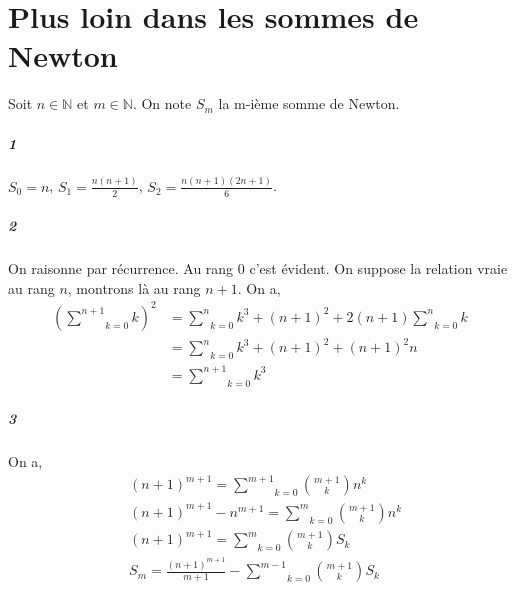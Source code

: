 \documentclass[10pt,a4paper]{article}
\begin{document}
\section{Plus loin dans les sommes de Newton}
Soit $n \in \mathbb{N}$ et $m \in \mathbb{N}$. On note $S_m$ la m-ième somme de Newton.
\subparagraph{1}$S_0 = n$, $S_1 = \frac{n(n+1)}{2}$, $S_2 = \frac{n(n+1)(2n+1)}{6}$.
\subparagraph{2}On raisonne par récurrence. Au rang $0$ c'est évident. On suppose la relation vraie au rang $n$, montrons là au rang $n+1$. On a,
\begin{equation}
\begin{aligned}
\left(\underset{k=0}{\overset{n+1}{\sum}} k\right)^2 &= \underset{k=0}{\overset{n}{\sum}}k^3 + (n+1)^2 + 2(n+1) \underset{k=0}{\overset{n}{\sum}} k \\
&= \underset{k=0}{\overset{n}{\sum}}k^3  + (n+1)^2 + (n+1)^2n \\
&= \underset{k=0}{\overset{n+1}{\sum}}k^3
\end{aligned}
\end{equation}
\subparagraph{3}On a,
\begin{equation}
\begin{aligned}
&(n+1)^{m+1} = \underset{k=0}{\overset{m+1}{\sum}}\binom{m+1}{k}n^k \\
&(n+1)^{m+1} - n^{m+1} = \underset{k=0}{\overset{m}{\sum}}\binom{m+1}{k}n^k \\
&(n+1)^{m+1} = \underset{k=0}{\overset{m}{\sum}} \binom{m+1}{k} S_k \\
& S_{m} = \frac{(n+1)^{m+1}}{m+1} - \underset{k=0}{\overset{m-1}{\sum}} \binom{m+1}{k} S_k
\end{aligned}
\end{equation}
\end{document}
